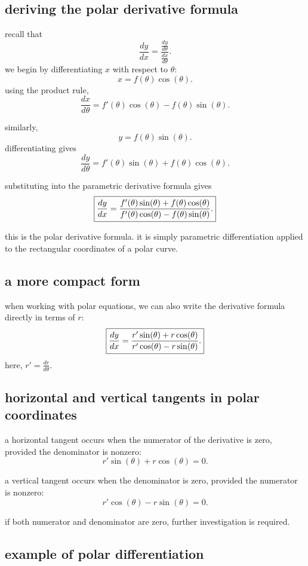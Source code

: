 \documentclass{article}
\newcommand{\mybox}[1]{\fbox{\ensuremath{\displaystyle #1}}}
\begin{document}
\subsection{deriving the polar derivative formula}

recall that
\[
\frac{dy}{dx}
=
\frac{\frac{dy}{d\theta}}{\frac{dx}{d\theta}}.
\]
we begin by differentiating $x$ with respect to $\theta$:
\[
x=f(\theta)\cos(\theta).
\]
using the product rule,
\[
\frac{dx}{d\theta}
=
f'(\theta)\cos(\theta)
-
f(\theta)\sin(\theta).
\]

similarly,
\[
y=f(\theta)\sin(\theta).
\]
differentiating gives
\[
\frac{dy}{d\theta}
=
f'(\theta)\sin(\theta)
+
f(\theta)\cos(\theta).
\]

substituting into the parametric derivative formula gives
\[
\mybox{
\frac{dy}{dx}
=
\frac{
f'(\theta)\sin(\theta)+f(\theta)\cos(\theta)
}{
f'(\theta)\cos(\theta)-f(\theta)\sin(\theta)
}.
}
\]

this is the polar derivative formula. it is simply parametric differentiation applied to the rectangular coordinates of a polar curve.\\

\subsection{a more compact form}

when working with polar equations, we can also write the derivative formula directly in terms of $r$:
\[
\mybox{
\frac{dy}{dx}
=
\frac{
r'\sin(\theta)+r\cos(\theta)
}{
r'\cos(\theta)-r\sin(\theta)
}.
}
\]
here, $r'=\frac{dr}{d\theta}$.\\

\subsection{horizontal and vertical tangents in polar coordinates}

a horizontal tangent occurs when the numerator of the derivative is zero, provided the denominator is nonzero:
\[
r'\sin(\theta)+r\cos(\theta)=0.
\]

a vertical tangent occurs when the denominator is zero, provided the numerator is nonzero:
\[
r'\cos(\theta)-r\sin(\theta)=0.
\]

if both numerator and denominator are zero, further investigation is required.\\

\subsection{example of polar differentiation}
\end{document}

